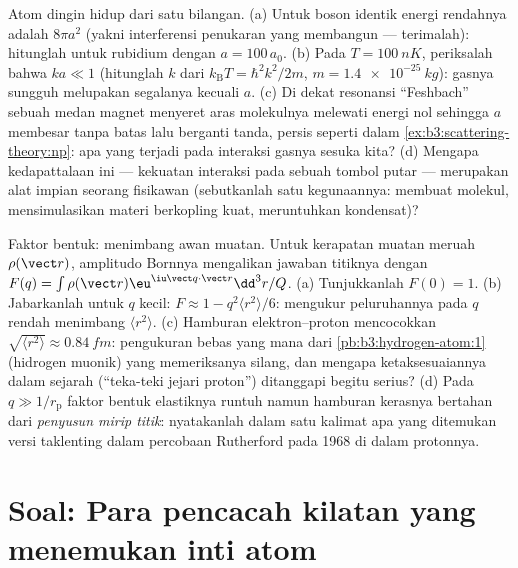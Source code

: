 \begin{exercise}[$\star\star\star$]\label{exo:b3:scattering-theory:11}
Atom dingin hidup dari satu bilangan. (a) Untuk boson identik  energi rendahnya adalah $8\pi a^2$ (yakni interferensi
penukaran yang membangun --- terimalah): hitunglah untuk rubidium dengan $a =
100\,a_0$. (b) Pada $T = \qty{100}{nK}$, periksalah bahwa
$ka \ll 1$ (hitunglah $k$ dari $k_{\text{B}}T = \hbar^2k^2/2m$, $m =
\qty{1.4e-25}{kg}$): gasnya sungguh melupakan segalanya kecuali $a$.
(c) Di dekat resonansi ``Feshbach'' sebuah medan magnet menyeret aras
molekulnya melewati energi nol sehingga $a$ membesar tanpa batas lalu
berganti tanda, persis seperti dalam \cref{ex:b3:scattering-theory:np}:
apa yang terjadi pada interaksi gasnya sesuka kita? (d) Mengapa
kedapattalaan ini --- kekuatan interaksi pada sebuah tombol putar ---
merupakan alat impian seorang fisikawan (sebutkanlah satu kegunaannya:
membuat molekul, mensimulasikan materi berkopling kuat, meruntuhkan
kondensat)?
\end{exercise}

\begin{exercise}[$\star\star\star$]\label{exo:b3:scattering-theory:12}
Faktor bentuk: menimbang awan muatan. Untuk kerapatan muatan meruah
$\rho(\vect r)$, amplitudo Bornnya mengalikan jawaban titiknya dengan
$F(q) = \int\rho(\vect r)\eu^{\iu\vect q\cdot\vect r}
\dd^3r/Q$. (a) Tunjukkanlah $F(0) = 1$. (b) Jabarkanlah untuk $q$ kecil: $F
\approx 1 - q^2\langle r^2\rangle/6$: mengukur peluruhannya pada $q$
rendah menimbang $\langle r^2\rangle$. (c) Hamburan elektron--proton
mencocokkan $\sqrt{\langle r^2\rangle} \approx \qty{0.84}{fm}$:
pengukuran bebas yang mana dari
\cref{pb:b3:hydrogen-atom:1} (hidrogen muonik) yang memeriksanya silang,
dan mengapa ketaksesuaiannya dalam sejarah (``teka-teki jejari proton'')
ditanggapi begitu serius? (d) Pada $q \gg 1/r_{\text{p}}$ faktor bentuk
elastiknya runtuh namun hamburan kerasnya bertahan dari
\emph{penyusun mirip titik}: nyatakanlah dalam satu kalimat apa yang
ditemukan versi taklenting dalam percobaan Rutherford pada 1968 di dalam
protonnya.
\end{exercise}

\section{Soal: Para pencacah kilatan yang menemukan inti atom}

